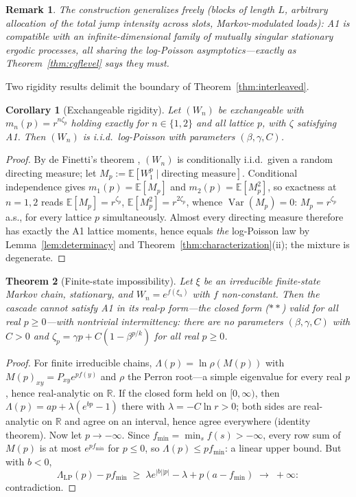 \documentclass[pdflatex,sn-mathphys-num]{sn-jnl}
\theoremstyle{thmstyleone}
\newtheorem{theorem}{Theorem}
\newtheorem{corollary}[theorem]{Corollary}
\theoremstyle{thmstyletwo}
\newtheorem*{remark}{Remark}
\theoremstyle{thmstylethree}
\DeclareMathOperator{\Var}{Var}
\begin{document}
\begin{remark}
The construction generalizes freely (blocks of length $L$, arbitrary
allocation of the total jump intensity across slots,
Markov-modulated loads): A1 is compatible with an
infinite-dimensional family of mutually singular stationary ergodic
processes, all sharing the log-Poisson asymptotics---exactly as
Theorem~\ref{thm:cgflevel} says they must.
\end{remark}

Two rigidity results delimit the boundary of
Theorem~\ref{thm:interleaved}.

\begin{corollary}[Exchangeable rigidity]\label{cor:exch}
Let $(W_n)$ be exchangeable with $m_n(p) = r^{n\zeta_p}$ holding
exactly for $n \in \{1,2\}$ and all lattice $p$, with $\zeta$
satisfying A1.  Then $(W_n)$ is i.i.d.\ log-Poisson with parameters
$(\beta, \gamma, C)$.
\end{corollary}

\begin{proof}
By de Finetti's theorem \cite{Kal02}, $(W_n)$ is conditionally
i.i.d.\ given a random directing measure; let $M_p :=
\mathbb{E}[W_1^p \mid \text{directing measure}]$.  Conditional
independence gives $m_1(p) = \mathbb{E}[M_p]$ and $m_2(p) =
\mathbb{E}[M_p^2]$, so exactness at $n = 1,2$ reads
$\mathbb{E}[M_p] = r^{\zeta_p}$, $\mathbb{E}[M_p^2] =
r^{2\zeta_p}$, whence $\Var(M_p) = 0$: $M_p = r^{\zeta_p}$ a.s., for
every lattice $p$ simultaneously.  Almost every directing measure
therefore has exactly the A1 lattice moments, hence equals
\emph{the} log-Poisson law by Lemma~\ref{lem:determinacy} and
Theorem~\ref{thm:characterization}(ii); the mixture is degenerate.
\end{proof}

\begin{theorem}[Finite-state impossibility]\label{thm:finitestate}
Let $\xi$ be an irreducible finite-state Markov chain, stationary,
and $W_n = e^{f(\xi_n)}$ with $f$ non-constant.  Then the cascade
cannot satisfy A1 in its real-$p$ form---the closed form
\textup{($**$)} valid for all real $p \ge 0$---with nontrivial
intermittency: there are no parameters $(\beta, \gamma, C)$ with
$C > 0$ and $\zeta_p = \gamma p + C(1-\beta^{p/k})$ for all real
$p \ge 0$.
\end{theorem}

\begin{proof}
For finite irreducible chains, $\Lambda(p) = \ln\rho(M(p))$ with
$M(p)_{xy} = P_{xy}e^{pf(y)}$ and $\rho$ the Perron root---a simple
eigenvalue for every real $p$, hence real-analytic on $\mathbb{R}$.
If the closed form held on $[0,\infty)$, then $\Lambda(p) = ap +
\lambda(e^{bp}-1)$ there with $\lambda = -C\ln r > 0$; both sides
are real-analytic on $\mathbb{R}$ and agree on an interval, hence
agree everywhere (identity theorem).  Now let $p \to -\infty$.
Since $f_{\min} = \min_s f(s) > -\infty$, every row sum of $M(p)$
is at most $e^{pf_{\min}}$ for $p \le 0$, so $\Lambda(p) \le
pf_{\min}$: a linear upper bound.  But with $b < 0$,
\[
  \Lambda_{\mathrm{LP}}(p) - pf_{\min}
  \;\ge\; \lambda e^{|b||p|} - \lambda + p(a - f_{\min})
  \;\longrightarrow\; +\infty :
\]
contradiction.
\end{proof}
\end{document}
